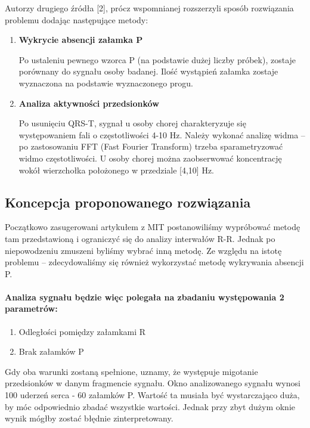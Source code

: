 Autorzy drugiego źródła [2], prócz wspomnianej rozszerzyli sposób rozwiązania problemu dodając następujące metody:
\begin{enumerate}
 \item \textbf{Wykrycie absencji załamka P}
 
    Po ustaleniu pewnego wzorca  P (na podstawie dużej liczby próbek), 
    zostaje porównany do sygnału osoby badanej. 
    Ilość wystąpień załamka zostaje wyznaczona na podstawie wyznaczonego progu.
 \item \textbf{Analiza aktywności przedsionków}
 
    Po usunięciu QRS-T, sygnał u osoby chorej charakteryzuje się występowaniem fali o częstotliwości 4-10 Hz. 
    Należy wykonać analizę widma -- po zastosowaniu FFT (Fast Fourier Transform) 
    trzeba sparametryzować widmo częstotliwości.  
    U osoby chorej można zaobserwować koncentrację wokół wierzchołka położonego w przedziale [4,10] Hz.
\end{enumerate}

\subsection{Koncepcja proponowanego rozwiązania}
Początkowo zasugerowani artykułem z MIT postanowiliśmy wypróbować metodę tam przedstawioną 
i ograniczyć się do analizy interwałów R-R. 
Jednak po niepowodzeniu zmuszeni byliśmy wybrać inną metodę. 
Ze względu na istotę problemu -- zdecydowaliśmy się również wykorzystać metodę wykrywania absencji P.
\paragraph{Analiza sygnału będzie więc polegała na zbadaniu występowania 2 parametrów:}
\begin{enumerate}
    \item Odległości pomiędzy załamkami R
    \item Brak załamków P
\end{enumerate}
Gdy oba warunki zostaną spełnione, uznamy, że występuje migotanie przedsionków w danym fragmencie sygnału.
Okno analizowanego sygnału wynosi 100 uderzeń serca - 60 załamków P.
Wartość ta musiała być wystarczająco duża, by móc odpowiednio zbadać wszystkie wartości.
Jednak przy zbyt dużym oknie wynik mógłby zostać błędnie zinterpretowany.

